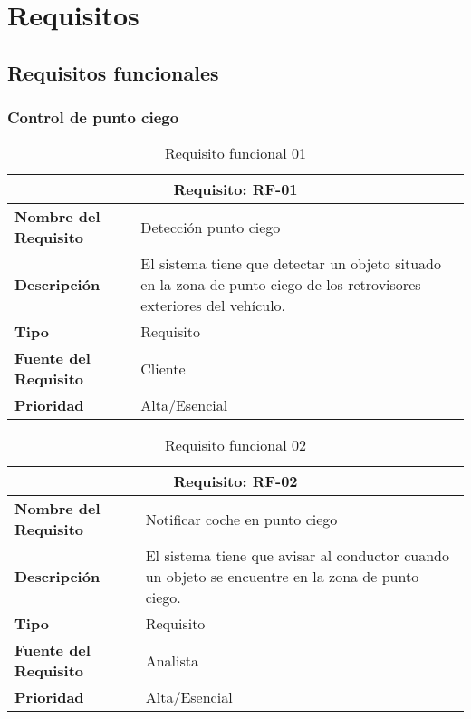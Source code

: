 \section{Requisitos}
\subsection{Requisitos funcionales}


\subsubsection{Control de punto ciego}

\begin{table}[H]
\begin{center}
\begin{tabular}{p{} p{7cm}}
\multicolumn{2}{c}{\textbf{Requisito: RF-01} } \\
\hline \hline
\textbf{Nombre del Requisito} & Detección punto ciego  \\
\hline
\textbf{Descripción} & El sistema tiene que detectar un objeto situado en la zona de punto ciego de los retrovisores exteriores del vehículo.  \\
\hline
\textbf{Tipo} & Requisito  \\
\hline
\textbf{Fuente del Requisito} & Cliente  \\
\hline
\textbf{Prioridad} & Alta/Esencial  \\ \hline
\end{tabular}
\caption{Requisito funcional 01}
\label{tab:RF-01}
\end{center}
\end{table}

\begin{table}[H]
\begin{center}
\begin{tabular}{p{} p{7cm}}
\multicolumn{2}{c}{\textbf{Requisito: RF-02} } \\
\hline \hline
\textbf{Nombre del Requisito} & Notificar coche en punto ciego  \\
\hline
\textbf{Descripción} & El sistema tiene que avisar al conductor cuando un objeto se encuentre en la zona de punto ciego. \\
\hline
\textbf{Tipo} & Requisito  \\
\hline
\textbf{Fuente del Requisito} & Analista  \\
\hline
\textbf{Prioridad} & Alta/Esencial  \\ \hline
\end{tabular}
\caption{Requisito funcional 02}
\label{tab:RF-02}
\end{center}
\end{table}

